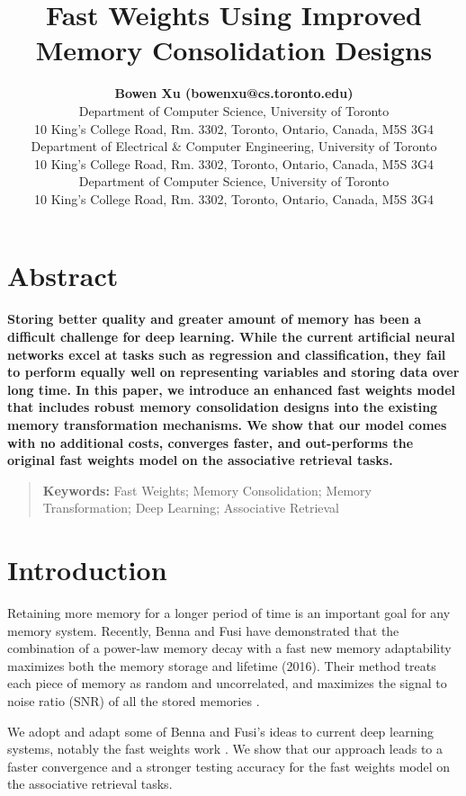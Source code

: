 \documentclass[10pt,letterpaper]{article}
\title{Fast Weights Using Improved Memory Consolidation Designs}
\author{{\large \bf Bowen Xu (bowenxu@cs.toronto.edu)} \\
  Department of Computer Science, University of Toronto \\
  10 King's College Road, Rm. 3302, Toronto, Ontario, Canada, M5S 3G4
  \AND {\large \bf Jimmy Ba (jimmy@psi.toronto.edu)} \\
  Department of Electrical \& Computer Engineering, University of Toronto \\ 
  10 King's College Road, Rm. 3302, Toronto, Ontario, Canada, M5S 3G4
  \AND {\large \bf Richard Zemel (zemel@cs.toronto.edu)} \\
  Department of Computer Science, University of Toronto \\
  10 King's College Road, Rm. 3302, Toronto, Ontario, Canada, M5S 3G4}
\begin{document}
\maketitle


\section{Abstract}
{
\bf
Storing better quality and greater amount of memory has been a difficult challenge for deep learning.
While the current artificial neural networks excel at tasks such as regression and classification, they fail to perform equally well on representing variables and storing data over long time.
In this paper, we introduce an enhanced fast weights model that includes robust memory consolidation designs into the existing memory transformation mechanisms.
We show that our model comes with no additional costs, converges faster, and out-performs the original fast weights model on the associative retrieval tasks.
}
\begin{quote}
\small
\textbf{Keywords:} 
Fast Weights; Memory Consolidation; Memory Transformation; Deep Learning; Associative Retrieval
\end{quote}

\section{Introduction}
Retaining more memory for a longer period of time is an important goal for any memory system.
Recently, Benna and Fusi have demonstrated that the combination of a power-law memory decay with a fast new memory adaptability maximizes both the memory storage and lifetime (2016).
Their method treats each piece of memory as random and uncorrelated, and maximizes the signal to noise ratio (SNR) of all the stored memories \cite{pld}.

We adopt and adapt some of Benna and Fusi's ideas to current deep learning systems, notably the fast weights work \cite{fw}.
We show that our approach leads to a faster convergence and  a stronger testing accuracy for the fast weights model on the associative retrieval tasks.
\end{document}
